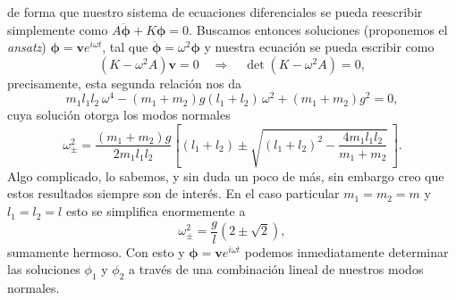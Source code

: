 \documentclass{article}
\begin{document}
de forma que nuestro sistema de ecuaciones diferenciales se pueda reescribir simplemente como $A\boldsymbol{\ddot{\phi}} + K\boldsymbol{\phi}=0$. Buscamos entonces soluciones (proponemos el \textit{ansatz}) $\boldsymbol{\phi}=\mathbf{v} e^{i\omega t}$, tal que $\boldsymbol{\ddot{\phi}}=\omega^2 \boldsymbol{\phi}$ y nuestra ecuaci\'on se pueda escribir como
\begin{equation}
    (K-\omega^2A)\mathbf{v}=0 \quad\Rightarrow\quad \det(K-\omega^2A)=0,
\end{equation}
precisamente, esta segunda relaci\'on nos da
\begin{equation*}
    m_1l_1l_2\,\omega^4 - (m_1+m_2)g(l_1+l_2)\,\omega^2 + (m_1+m_2)g^2 = 0,
\end{equation*}
cuya soluci\'on otorga los modos normales
\begin{equation}
    \omega^2_{\pm} = \frac{(m_1+m_2)g}{2m_1l_1l_2}\left[(l_1+l_2)\pm\sqrt{(l_1+l_2)^2-\frac{4m_1l_1l_2}{m_1+m_2}}\,\right].
\end{equation}
Algo complicado, lo sabemos, y sin duda un poco de m\'as, sin embargo creo que estos resultados siempre son de inter\'es. En el caso particular $m_1=m_2=m$ y $l_1=l_2=l$ esto se simplifica enormemente a
\begin{equation*}
    \omega^2_{\pm} = \frac{g}{l} (2\pm\sqrt{2}),
\end{equation*}
sumamente hermoso. Con esto y $\boldsymbol{\phi}=\mathbf{v} e^{i\omega t}$ podemos inmediatamente determinar las soluciones $\phi_1$ y $\phi_2$ a trav\'es de una combinaci\'on lineal de nuestros modos normales.

\vspace{0.5cm}
\begin{center}
\end{center}  \vspace{0.5cm}
\end{document}
